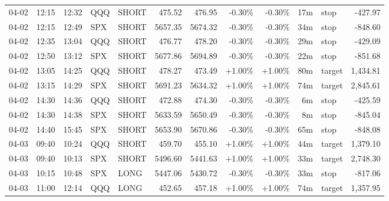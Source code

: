 \documentclass[11pt,a4paper,twoside]{article}
\begin{document}
\begin{center}
\begin{longtable}{>{\color{txtmain}}l l l l l r r r r r >{\color{txtmain}}l r}
04-02 & 12:15 & 12:32 & QQQ & SHORT & 475.52 & 476.95 & \textcolor{lossred}{-0.30\%} & \textcolor{lossred}{-0.30\%} & 17m & stop & \textcolor{lossred}{-427.97} \\
04-02 & 12:15 & 12:49 & SPX & SHORT & 5657.35 & 5674.32 & \textcolor{lossred}{-0.30\%} & \textcolor{lossred}{-0.30\%} & 34m & stop & \textcolor{lossred}{-848.60} \\
04-02 & 12:35 & 13:04 & QQQ & SHORT & 476.77 & 478.20 & \textcolor{lossred}{-0.30\%} & \textcolor{lossred}{-0.30\%} & 29m & stop & \textcolor{lossred}{-429.09} \\
04-02 & 12:50 & 13:12 & SPX & SHORT & 5677.86 & 5694.89 & \textcolor{lossred}{-0.30\%} & \textcolor{lossred}{-0.30\%} & 22m & stop & \textcolor{lossred}{-851.68} \\
04-02 & 13:05 & 14:25 & QQQ & SHORT & 478.27 & 473.49 & \textcolor{wingreen}{+1.00\%} & \textcolor{wingreen}{+1.00\%} & 80m & target & \textcolor{wingreen}{1,434.81} \\
04-02 & 13:15 & 14:29 & SPX & SHORT & 5691.23 & 5634.32 & \textcolor{wingreen}{+1.00\%} & \textcolor{wingreen}{+1.00\%} & 74m & target & \textcolor{wingreen}{2,845.61} \\
04-02 & 14:30 & 14:36 & QQQ & SHORT & 472.88 & 474.30 & \textcolor{lossred}{-0.30\%} & \textcolor{lossred}{-0.30\%} & 6m & stop & \textcolor{lossred}{-425.59} \\
04-02 & 14:30 & 14:38 & SPX & SHORT & 5633.59 & 5650.49 & \textcolor{lossred}{-0.30\%} & \textcolor{lossred}{-0.30\%} & 8m & stop & \textcolor{lossred}{-845.04} \\
04-02 & 14:40 & 15:45 & SPX & SHORT & 5653.90 & 5670.86 & \textcolor{lossred}{-0.30\%} & \textcolor{lossred}{-0.30\%} & 65m & stop & \textcolor{lossred}{-848.08} \\
04-03 & 09:40 & 10:24 & QQQ & SHORT & 459.70 & 455.10 & \textcolor{wingreen}{+1.00\%} & \textcolor{wingreen}{+1.00\%} & 44m & target & \textcolor{wingreen}{1,379.10} \\
04-03 & 09:40 & 10:13 & SPX & SHORT & 5496.60 & 5441.63 & \textcolor{wingreen}{+1.00\%} & \textcolor{wingreen}{+1.00\%} & 33m & target & \textcolor{wingreen}{2,748.30} \\
04-03 & 10:15 & 10:48 & SPX & LONG & 5447.06 & 5430.72 & \textcolor{lossred}{-0.30\%} & \textcolor{lossred}{-0.30\%} & 33m & stop & \textcolor{lossred}{-817.06} \\
04-03 & 11:00 & 12:14 & QQQ & LONG & 452.65 & 457.18 & \textcolor{wingreen}{+1.00\%} & \textcolor{wingreen}{+1.00\%} & 74m & target & \textcolor{wingreen}{1,357.95} \\

\end{longtable}
\end{center}
\end{document}
